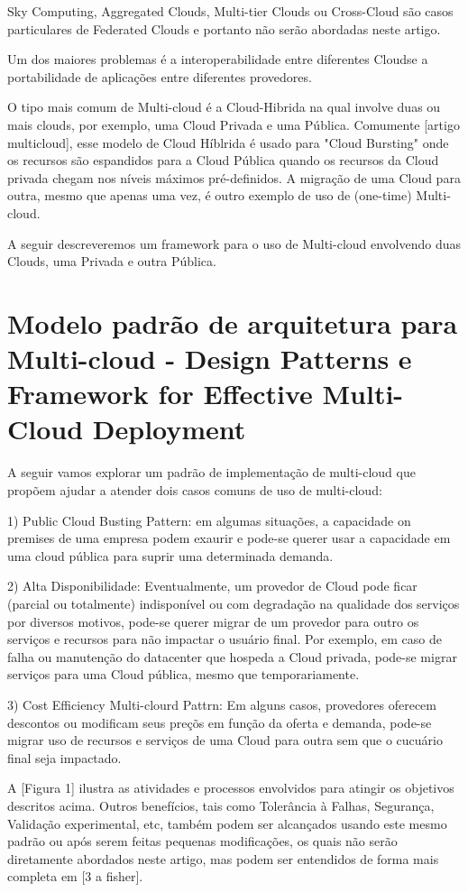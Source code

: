 \documentclass[12pt]{article}
\begin{document}
	Sky Computing, Aggregated Clouds, Multi-tier Clouds ou Cross-Cloud são casos particulares de Federated Clouds e portanto não serão abordadas neste artigo. 
	
	Um dos maiores problemas é a interoperabilidade entre diferentes Cloudse a portabilidade de aplicações entre diferentes provedores.
	
	O tipo mais comum de Multi-cloud é a Cloud-Hibrida na qual involve duas ou mais clouds, por exemplo, uma Cloud Privada e uma Pública. Comumente [artigo multicloud], esse modelo de Cloud Híblrida é usado para "Cloud Bursting" onde os recursos são espandidos para a Cloud Pública quando os recursos da Cloud privada chegam nos níveis máximos pré-definidos. A migração de uma Cloud para outra, mesmo que apenas uma vez, é outro exemplo de uso de (one-time) Multi-cloud.
	
	A seguir descreveremos um framework para o uso de Multi-cloud envolvendo duas Clouds, uma Privada e outra Pública. 
	
	\section{Modelo padrão de arquitetura para Multi-cloud - Design Patterns e Framework for Effective Multi-Cloud Deployment }
	
	A seguir vamos explorar um padrão de implementação de multi-cloud que propõem ajudar a atender dois casos comuns de uso de multi-cloud:
	
	1) Public Cloud Busting Pattern: em algumas situações, a capacidade on premises de uma empresa podem exaurir e pode-se querer usar a capacidade em uma cloud pública para suprir uma determinada demanda.
	
	2) Alta Disponibilidade: Eventualmente, um provedor de Cloud pode ficar (parcial ou totalmente) indisponível ou com degradação na qualidade dos serviços por diversos motivos, pode-se querer migrar de um provedor para outro os serviços e recursos para não impactar o usuário final. Por exemplo, em caso de falha ou manutenção do datacenter que hospeda a Cloud privada, pode-se migrar serviços para uma Cloud pública, mesmo que temporariamente.
	   
	3) Cost Efficiency Multi-clourd Pattrn: Em alguns casos, provedores oferecem descontos ou modificam seus preçõs em função da oferta e demanda, pode-se migrar uso de recursos e serviços de uma Cloud para outra sem que o cucuário final seja impactado.
	
	A [Figura 1] ilustra as atividades e processos envolvidos para atingir os objetivos descritos acima. Outros benefícios, tais como Tolerância à Falhas, Segurança, Validação experimental, etc, também podem ser alcançados usando este mesmo padrão ou após serem feitas pequenas modificações, os quais não serão diretamente abordados neste artigo, mas podem ser entendidos de forma mais completa em [3 a fisher].
	
\end{document}

